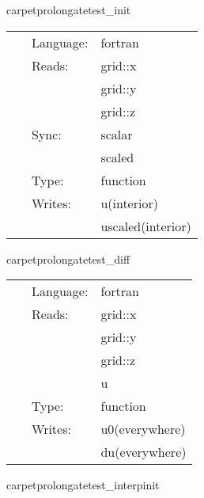 \vspace{5mm}


\hspace{5mm} carpetprolongatetest\_init 

\hspace{5mm}{\it set up initial data } 


\hspace{5mm}

 \begin{tabular*}{160mm}{cll} 
~ & Language:  & fortran \\ 
~ & Reads:  & grid::x \\ 
~& ~ &grid::y\\ 
~& ~ &grid::z\\ 
~ & Sync:  & scalar \\ 
~& ~ &scaled\\ 
~ & Type:  & function \\ 
~ & Writes:  & u(interior) \\ 
~& ~ &uscaled(interior)\\ 
\end{tabular*} 


\vspace{5mm}


\hspace{5mm} carpetprolongatetest\_diff 

\hspace{5mm}{\it test data } 


\hspace{5mm}

 \begin{tabular*}{160mm}{cll} 
~ & Language:  & fortran \\ 
~ & Reads:  & grid::x \\ 
~& ~ &grid::y\\ 
~& ~ &grid::z\\ 
~& ~ &u\\ 
~ & Type:  & function \\ 
~ & Writes:  & u0(everywhere) \\ 
~& ~ &du(everywhere)\\ 
\end{tabular*} 


\vspace{5mm}


\hspace{5mm} carpetprolongatetest\_interpinit 

